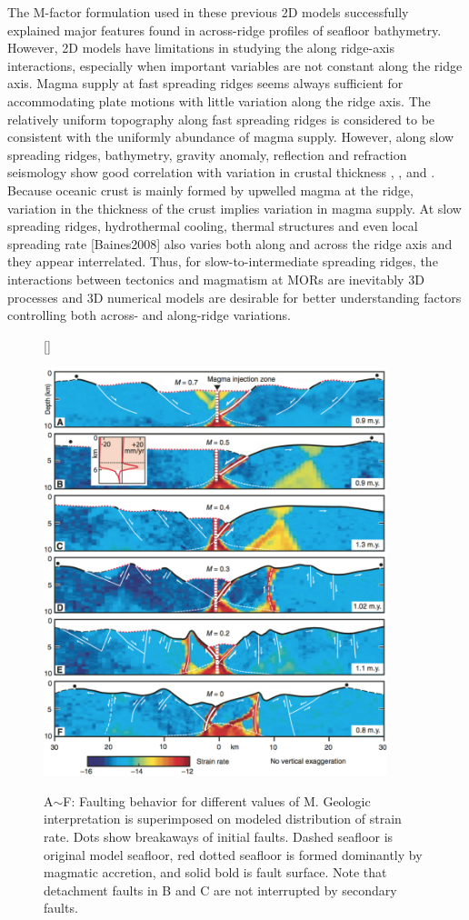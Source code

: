 \documentclass[12pt]{article}
\begin{document}
The M-factor formulation used in these previous 2D models successfully explained major features found in across-ridge profiles of seafloor bathymetry. However, 2D models have limitations in studying the along ridge-axis interactions, especially when important variables are not constant along the ridge axis. Magma supply at fast spreading ridges seems always sufficient for accommodating plate motions with little variation along the ridge axis. The relatively uniform topography along fast spreading ridges is considered to be consistent with the uniformly abundance of magma supply. However, along slow spreading ridges, bathymetry, gravity anomaly, reflection and refraction seismology show good correlation with variation in crustal thickness \citep{Ryan2009}, \citep{Chen1999}, \citep{Lin1990} and \citep{Tolstoy1993}. Because oceanic crust is mainly formed by upwelled magma at the ridge, variation in the thickness of the crust implies variation in magma supply. At slow spreading ridges, hydrothermal cooling, thermal structures and even local spreading rate [Baines2008] also varies both along and across the ridge axis and they appear interrelated. Thus, for slow-to-intermediate spreading ridges, the interactions between tectonics and magmatism at MORs are inevitably 3D processes and 3D numerical models are desirable for better understanding factors controlling both across- and along-ridge variations. 
\begin{figure}[H]
[\FBwidth]
{\caption{\small A$\sim$F: Faulting behavior for different values of M. Geologic interpretation is superimposed on modeled distribution of strain rate. Dots show breakaways of initial faults. Dashed seafloor is original model seafloor, red dotted seafloor is formed dominantly by magmatic accretion, and solid bold is fault surface. Note that detachment faults in B and C are not interrupted by secondary faults. \citep{Tucholke2008}}}
 {\includegraphics[width=10cm]{fig6_1.png}} 
 \label{fig6_1}
\end{figure}
\end{document}
